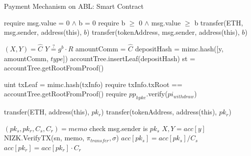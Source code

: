 \documentclass{article}
\begin{document}
\begin{algorithm}
 \DontPrintSemicolon
 \LinesNumbered
 \caption{Payment Mechanism on ABL: Smart Contract}
  \begin{multicols}{2}
  

   {

     {
        require msg.value = 0 $\land$ b = 0 \;
    } {
     {
        require b $\ge$ 0 $\land$ msg.value $\ge$ b \;
        transfer(ETH, msg.sender, address(this), $b$)
    } {
        transfer(tokenAddress, msg.sender, address(this), $b$)
    }
    }
    
    $(X, Y) = \hat{C}$ \; 
    $Y \overset{?}{=} g^b \cdot R$ \;
    amountComm = $\hat{C}$ \;
    depositHash = mimc.hash([y, amountComm, $type$]) \;
    accountTree.insertLeaf(depositHash) \;
    st = accountTree.getRootFromProof()
  }
  
   {
    
    uint txLeaf = mimc.hash(txInfo) \;
    require txInfo.txRoot == accountTree.getRootFromProof() \;
    require $pp_{hpke}$.verify($pi_{withdraw}$) \;
    
     {
        transfer(ETH, address(this), $pk_r$)
    }{
        transfer(tokenAddress, address(this), $pk_r$)
    } 
  }
 
   {
    
    $(pk_s, pk_r, C_s, C_r) = memo$ \;
    check msg.sender is $pk_s$ \;
    $X, Y = acc[y]$ \;
    NIZK.VerifyTX(sn, memo, $\pi_{transfer}, \sigma$) \;
    $acc[pk_s] = acc[pk_s]/C_s$ \;
    $acc[pk_r] = acc[pk_r]\cdot C_r$
  }


\end{multicols}
\end{algorithm}
\end{document}
